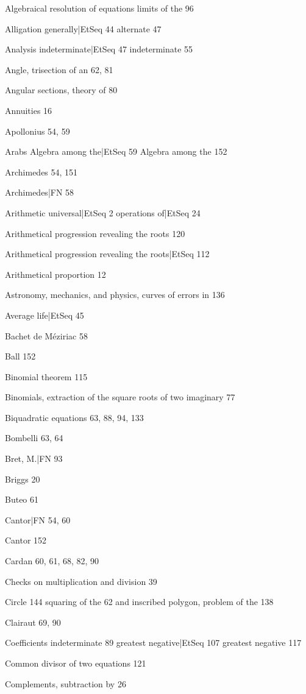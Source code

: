 \documentclass[12pt]{book}[2005/09/16]
\begin{document}
Algebraical resolution of equations
  limits of the 96

Alligation
  generally|EtSeq 44 %
  alternate 47

Analysis
  indeterminate|EtSeq 47 %
  indeterminate 55

Angle, trisection of an 62, 81

Angular sections, theory of 80

Annuities 16

Apollonius 54, 59

Arabs
  Algebra among the|EtSeq 59 %
  Algebra among the 152

Archimedes 54, 151

Archimedes|FN 58 %

Arithmetic
  universal|EtSeq 2 %
  operations of|EtSeq 24 %

Arithmetical progression revealing the roots 120

Arithmetical progression revealing the roots|EtSeq 112 %

Arithmetical proportion 12

Astronomy, mechanics, and physics, curves of errors in 136

Average life|EtSeq 45 %

Bachet de Méziriac 58

Ball 152

Binomial theorem 115

Binomials, extraction of the square roots of two imaginary 77

Biquadratic equations 63, 88, 94, 133

Bombelli 63, 64

Bret, M.|FN 93 %

Briggs 20

Buteo 61

Cantor|FN 54, 60 %

Cantor 152

Cardan 60, 61, 68, 82, 90

Checks on multiplication and division 39

Circle 144
  squaring of the 62
  and inscribed polygon, problem of the 138

Clairaut 69, 90

Coefficients
  indeterminate 89
  greatest negative|EtSeq 107 %
  greatest negative 117

Common divisor of two equations 121

Complements, subtraction by 26
\end{document}
